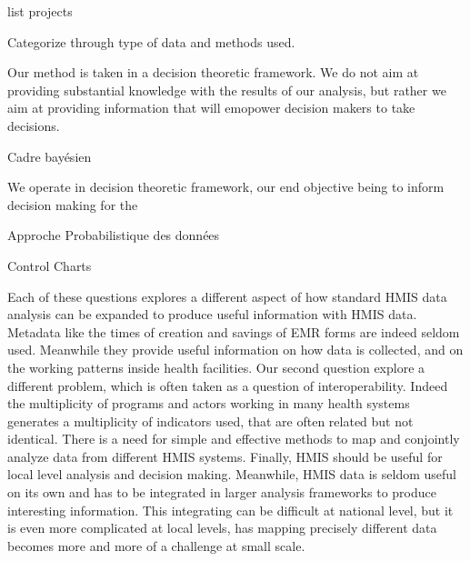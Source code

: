 
list projects

Categorize through type of data and methods used.


Our method is taken in a decision theoretic framework. We do not aim at providing substantial knowledge with the results of our analysis, but rather we aim at providing information that will emopower decision makers to take decisions.

Cadre bayésien %

We operate in decision theoretic framework, our end objective being to inform decision making for the

Approche Probabilistique des données

Control Charts



Each of these questions explores a different aspect of how standard HMIS data analysis can be expanded to produce useful information with HMIS data. Metadata like the times of creation and savings of EMR forms are indeed seldom used. Meanwhile they provide useful information on how data is collected, and on the working patterns inside health facilities. Our second question explore a different problem, which is often taken as a question of interoperability. Indeed the multiplicity of programs and actors working in many health systems generates a multiplicity of indicators used, that are often related but not identical. There is a need for simple and effective methods to map and conjointly analyze data from different HMIS systems. Finally, HMIS should be useful for local level analysis and decision making. Meanwhile, HMIS data is seldom useful on its own and has to be integrated in larger analysis frameworks to produce interesting information. This integrating can be difficult at national level, but it is even more complicated at local levels, has mapping precisely different data becomes more and more of a challenge at small scale.

